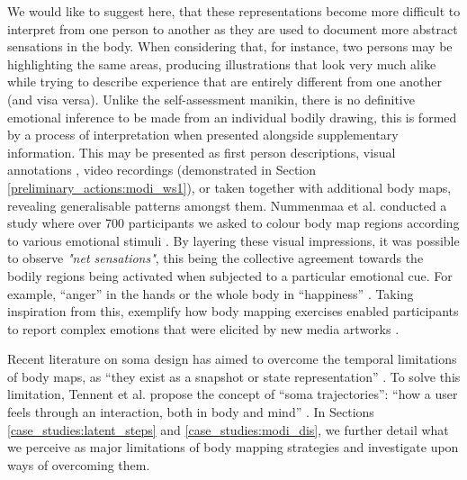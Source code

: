 
We would like to suggest here, that these representations become more difficult to interpret from one person to another as they are used to document more abstract sensations in the body. When considering that, for instance, two persons may be highlighting the same areas, producing illustrations that look very much alike while trying to describe experience that are entirely different from one another (and visa versa). Unlike the self-assessment manikin, there is no definitive emotional inference to be made from an individual bodily drawing, this is formed by a process of interpretation when presented alongside supplementary information. This may be presented as first person descriptions, visual annotations \cite{windlin_soma_2019}, video recordings (demonstrated in Section \ref{preliminary_actions:modi_ws1}), or taken together with additional body maps, revealing generalisable patterns amongst them. %
Nummenmaa et al. conducted a study where over 700 participants we asked to colour body map regions according to various emotional stimuli \cite{nummenmaa_bodily_2014}. By layering these visual impressions, it was possible to observe \textit{"net sensations"}, this being the collective agreement towards the bodily regions being activated when subjected to a particular emotional cue. For example, “anger” in the hands or the whole body in “happiness” \cite{davey_where_2021}. Taking inspiration from this, \citeauthor{schino_applying_2021} exemplify how body mapping exercises enabled participants to report complex emotions that were elicited by new media artworks \cite{schino_applying_2021}.

 Recent literature on soma design has aimed to overcome the temporal limitations of body maps, as “they exist as a snapshot or state representation” \cite{tennent_articulating_2021}. To solve this limitation, Tennent et al. propose the concept of “soma trajectories”: “how a user feels through an interaction, both in body and mind” \cite{tennent_articulating_2021}. In Sections \ref{case_studies:latent_steps} and \ref{case_studies:modi_dis}, we further detail what we perceive as major limitations of body mapping strategies and investigate upon ways of overcoming them.
 
